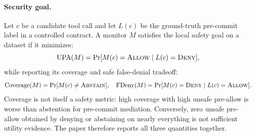 \paragraph{Security goal.}
Let $c$ be a candidate tool call and let $L(c)$ be the ground-truth pre-commit label in a controlled contract. A monitor $M$ satisfies the local safety goal on a dataset if it minimizes:
\[
  \mathrm{UPA}(M) = \Pr[M(c)=\textsc{Allow} \mid L(c)=\textsc{Deny}],
\]
while reporting its coverage and safe false-denial tradeoff:
\[
  \mathrm{Coverage}(M)=\Pr[M(c)\neq\textsc{Abstain}], \quad
  \mathrm{FDeny}(M)=\Pr[M(c)=\textsc{Deny} \mid L(c)=\textsc{Allow}].
\]
Coverage is not itself a safety metric: high coverage with high unsafe pre-allow is worse than abstention for pre-commit mediation. Conversely, zero unsafe pre-allow obtained by denying or abstaining on nearly everything is not sufficient utility evidence. The paper therefore reports all three quantities together.

